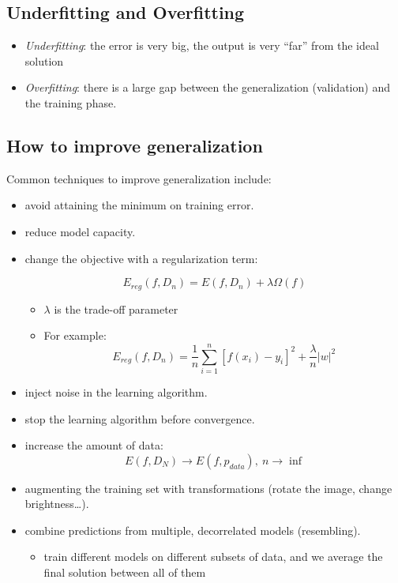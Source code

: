 \documentclass{article}
\begin{document}
\subsection{Underfitting and
Overfitting}\label{underfitting-and-overfitting}

\begin{itemize}
\tightlist
\item
  \emph{Underfitting}: the error is very big, the output is very ``far''
  from the ideal solution
\item
  \emph{Overfitting}: there is a large gap between the generalization
  (validation) and the training phase.
\end{itemize}

\subsection{How to improve
generalization}\label{how-to-improve-generalization}

Common techniques to improve generalization include:

\begin{itemize}
\item
  avoid attaining the minimum on training error.
\item
  reduce model capacity.
\item
  change the objective with a regularization term:

  \[E_{reg}(f, D_n) = E(f, D_n)+\lambda \Omega (f)\]

  \begin{itemize}
  \tightlist
  \item
    \(\lambda\) is the trade-off parameter
  \item
    For example:
    \[E_{reg}(f, D_n) = \frac{1}{n} \sum_{i=1}^{n} [f(x_i)-y_i]^2 + \frac{\lambda}{n} |w|^2\]
  \end{itemize}
\item
  inject noise in the learning algorithm.
\item
  stop the learning algorithm before convergence.
\item
  increase the amount of data:
  \[E(f, D_N) \rightarrow E(f, p_{data}),\ n \rightarrow \inf\]
\item
  augmenting the training set with transformations (rotate the image,
  change brightness\ldots).
\item
  combine predictions from multiple, decorrelated models (resembling).

  \begin{itemize}
  \tightlist
  \item
    train different models on different subsets of data, and we average
    the final solution between all of them
  \end{itemize}
\end{itemize}
\end{document}
